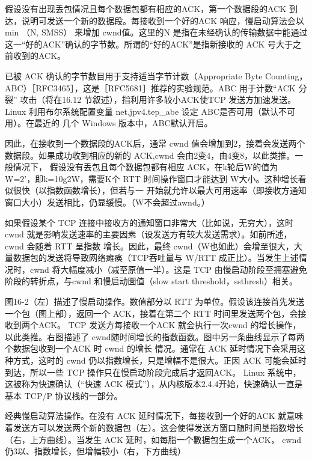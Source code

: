 假设没有出现丢包情况且每个数据包都有相应的ACK，第一个数据段的ACK 到达，说明可发送一个新的数据段。每接收到一个好的ACK 响应，慢启动算法会以 min （N, SMSS）
来增加 cwnd值。这里的N 是指在未经确认的传输数据中能通过这一“好的ACK”确认的字节数。所谓的“好的ACK”是指新接收的 ACK 号大于之前收到的ACK。

\begin{tcolorbox}
    已被 ACK 确认的字节数目用于支持适当字节计数（Appropriate Byte Counting，ABC）［RFC3465］，这是［RFC5681］推荐的实验规范。ABC 用于计数“ACK 分裂”
    攻击（将在16.12 节叙述），指利用许多较小ACK使TCP 发送方加速发送。Linux 利用布尔系统配置变量 net.jpv4.tep_abe 设定 ABC是否可用（默认不可用）。在最近的
    几个 Windows 版本中，ABC默认开启。
\end{tcolorbox}

因此，在接收到一个数据段的ACK后，通常 cwnd 值会增加到2，接着会发送两个数据段。如果成功收到相应的新的 ACK,cwnd 会由2变4，由4变8，以此类推。一般情况下，
假设没有丢包且每个数据包都有相应 ACK，在k轮后W的值为W=2’，即k=10g2W，需要K个 RTT 时间操作窗口才能达到 W大小。这种增长看似很快（以指数函数增长），但若与一
开始就允许以最大可用速率（即接收方通知窗口大小）发送相比，仍显缓慢。（W不会超过awnd。）

如果假设某个 TCP 连接中接收方的通知窗口非常大（比如说，无穷大），这时 cwnd 就是影响发送速率的主要因素（设发送方有较大发送需求）。如前所述，cwnd 会随着 RTT 呈指数
增长。因此，最终 cwnd（W也如此）会增至很大，大量数据包的发送将导致网络瘫痪（TCP吞吐量与 W/RTT 成正比）。当发生上述情况时，cwnd 将大幅度减小（减至原值一半）。这是
TCP 由慢启动阶段至拥塞避免阶段的转折点，与cwnd 和慢启动圖值（slow start threshold，ssthresh）相关。

图16-2（左）描述了慢启动操作。数值部分以 RTT 为单位。假设该连接首先发送一个包（图上部），返回一个 ACK，接着在第二个 RTT 时间里发送两个包，会接收到两个ACK。
TCP 发送方每接收一个ACK 就会执行一次cwnd 的增长操作，以此类推。右图描述了 cwnd随时间增长的指数函数。图中另一条曲线显示了每两个数据包收到一个ACK 时 cwnd 的增长
情况。通常在 ACK 延时情况下会采用这种方式，这时的 cwnd 仍以指数增长，只是增幅不是很大。正因 ACK 可能会延时到达，所以一些 TCP 操作只在慢启动阶段完成后才返回ACK。
Linux 系统中，这被称为快速确认（“快速 ACK 模式”），从内核版本2.4.4开始，快速确认一直是基本 TCP/P 协议栈的一部分。


经典慢启动算法操作。在没有 ACK 延时情况下，每接收到一个好的ACK 就意味着发送方可以发送两个新的数据包（左）。这会使得发送方窗口随时间垦指数增长（右，上方曲线）。当发生
ACK 延时，如每脂一个數据包生成一个ACK， cwnd 仍3以、指数增长，但增幅较小（右，下方曲线）


